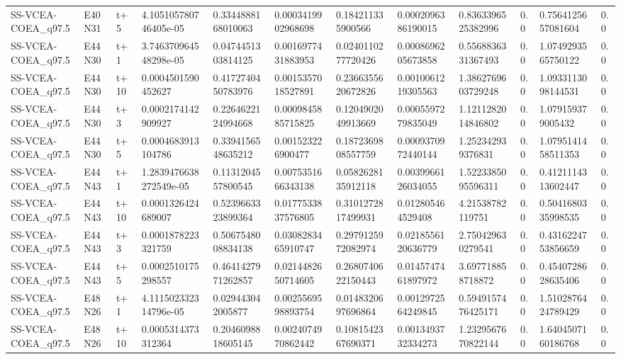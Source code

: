 \begin{landscape}
\begin{longtable}{llllllllllll}
SS-VCEA-COEA\_q97.5 & E40N31 & t+5 & 4.105105780746405e-05 & 0.3344888168010063 & 0.0003419902968698 & 0.184211335900566 & 0.0002096386190015 & 0.8363396525382996 & 0.0 & 0.7564125657081604 & 0.0 \\
SS-VCEA-COEA\_q97.5 & E44N30 & t+1 & 3.746370964548298e-05 & 0.0474451303814125 & 0.0016977431883953 & 0.0240110277720426 & 0.0008696205673858 & 0.5568836331367493 & 0.0 & 1.0749293565750122 & 0.0 \\
SS-VCEA-COEA\_q97.5 & E44N30 & t+10 & 0.0004501590452627 & 0.4172740450783976 & 0.0015357018527891 & 0.2366355620672826 & 0.0010061219305563 & 1.3862769603729248 & 0.0 & 1.0933113098144531 & 0.0 \\
SS-VCEA-COEA\_q97.5 & E44N30 & t+3 & 0.0002174142909927 & 0.2264622124994668 & 0.0009845885715825 & 0.1204902049913669 & 0.0005597279835049 & 1.1211282014846802 & 0.0 & 1.079159379005432 & 0.0 \\
SS-VCEA-COEA\_q97.5 & E44N30 & t+5 & 0.0004683913104786 & 0.3394156548635212 & 0.001523226900477 & 0.1872369808557759 & 0.0009370972440144 & 1.252342939376831 & 0.0 & 1.0795141458511353 & 0.0 \\
SS-VCEA-COEA\_q97.5 & E44N43 & t+1 & 1.2839476638272549e-05 & 0.1131204557800545 & 0.0075351666343138 & 0.0582628135912118 & 0.0039966126034055 & 1.5223385095596311 & 0.0 & 0.4121114313602447 & 0.0 \\
SS-VCEA-COEA\_q97.5 & E44N43 & t+10 & 0.0001326424689007 & 0.5239663323899364 & 0.0177533837576805 & 0.3101272817499931 & 0.012805464529408 & 4.21538782119751 & 0.0 & 0.5041680335998535 & 0.0 \\
SS-VCEA-COEA\_q97.5 & E44N43 & t+3 & 0.0001878223321759 & 0.5067548008834138 & 0.0308283465910747 & 0.2979125972082974 & 0.0218556120636779 & 2.750429630279541 & 0.0 & 0.4316224753856659 & 0.0 \\
SS-VCEA-COEA\_q97.5 & E44N43 & t+5 & 0.0002510175298557 & 0.4641427971262857 & 0.0214482650714605 & 0.2680740622150443 & 0.0145747461897972 & 3.697718858718872 & 0.0 & 0.4540728628635406 & 0.0 \\
SS-VCEA-COEA\_q97.5 & E48N26 & t+1 & 4.111502332314796e-05 & 0.029443042005877 & 0.0025569598893754 & 0.0148320697696864 & 0.0012972564249845 & 0.5949157476425171 & 0.0 & 1.5102876424789429 & 0.0 \\
SS-VCEA-COEA\_q97.5 & E48N26 & t+10 & 0.0005314373312364 & 0.2046098818605145 & 0.0024074970862442 & 0.1081542367690371 & 0.0013493732334273 & 1.2329567670822144 & 0.0 & 1.6404507160186768 & 0.0 \\

\end{longtable}
\end{landscape}
